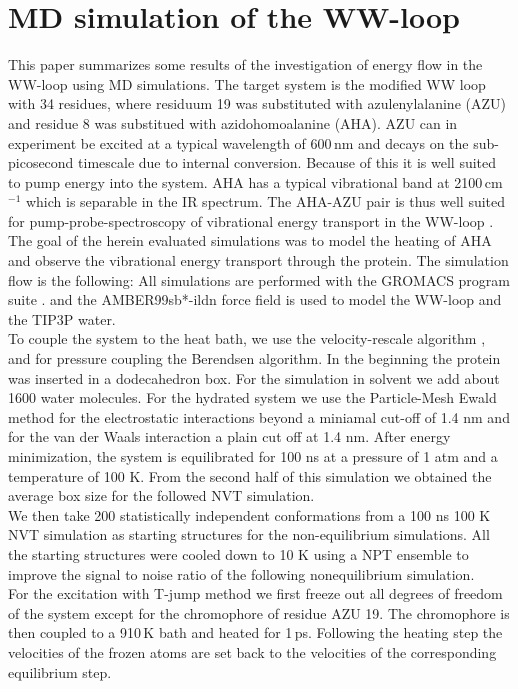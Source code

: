 \documentclass[11pt, a4paper]{report}
\begin{document}
\section*{MD simulation of the WW-loop}
This paper summarizes some results of the investigation of energy flow in
the WW-loop using MD simulations.  The target system is the modified WW loop with
34 residues, where residuum 19 was substituted with azulenylalanine (AZU) and
residue 8 was substitued with azidohomoalanine (AHA). AZU
can in experiment be excited at a typical wavelength of 600\,nm and decays on
the sub-picosecond timescale due to internal conversion. Because of this it is well
suited to pump energy into the system. AHA has a typical vibrational band at
2100\,cm$^{-1}$ which is separable in the IR spectrum. The AHA-AZU pair is thus
well suited for pump-probe-spectroscopy of vibrational energy transport in the
WW-loop \cite{C3CP54760D}.\\


The goal of the herein evaluated simulations was to model the heating of AHA and
observe the vibrational energy transport through the protein. The simulation
flow is the following: 
All simulations are performed with the GROMACS program suite \cite{GROMACS13}.
and the AMBER99sb*-ildn force field is used to model the WW-loop and the TIP3P water.\\
To couple the system to
the heat bath, we use the velocity-rescale algorithm \cite{Bussi07}, and for
pressure
coupling the Berendsen algorithm\cite{Berendsen84}. In the beginning the protein was inserted in a dodecahedron box. For the
simulation in solvent we add about 1600 water molecules. For the hydrated
system we use the Particle-Mesh Ewald method\cite{Darden93} for the
electrostatic
interactions beyond a miniamal cut-off of 1.4 nm and for the van der Waals
interaction a plain cut off at 1.4 nm. 
After energy minimization, the system is equilibrated for 100 ns at a pressure
of 1 atm and a temperature of 100
K. From the second half of this simulation we
obtained the average box size for the followed NVT simulation. \\
We then take 200 statistically
independent conformations from a 100 ns 100 K NVT simulation as starting
structures for the non-equilibrium simulations.
All the starting structures were cooled down to 10 K using a NPT ensemble to
improve
the signal to noise ratio of the following nonequilibrium simulation. \\

For the excitation with T-jump method we first freeze out all degrees
of freedom of the system except for the chromophore of residue AZU 19.
The chromophore is then coupled to a 910\,K bath and heated for 1\,ps.
Following the heating step the velocities of
the frozen atoms are set back to the velocities of the corresponding
equilibrium step.\\ 
\end{document}
